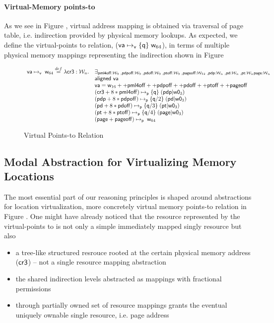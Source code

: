 \paragraph{Virtual-Memory points-to} As we see in Figure , virtual address mapping is obtained via traversal of page table, i.e. indirection provided by physical memory lookups. As expected, we define the virtual-points to relation, ($\mathsf{va}\mapsto_{\mathsf{v}}\{\mathsf{q}\}\;\mathsf{w}_{64}$), in terms of multiple physical memory mappings representing the indirection shown in Figure 
\begin{figure*}
\[
\begin{array}{cl}
  \mathsf{va}\mapsto_{\mathsf{v}}\;\mathsf{w}_{64} \stackrel{def}{=} \lambda \mathsf{cr3}:\mathcal{W}_n.
  & \exists_{\mathsf{pml4off}:\mathcal{W}_{9} \;, \mathsf{pdpoff}:\mathcal{W}_{9} \;, \mathsf{pdoff}:\mathcal{W}_{9} \;, \mathsf{ptoff}:\mathcal{W}_{9} \;, \mathsf{pageoff}:\mathcal{W}_{12} \;, \mathsf{pdp}:\mathcal{W}_n \;, \mathsf{pd}:\mathcal{W}_n \;, \mathsf{pt}:\mathcal{W}_n \mathsf{page}:\mathcal{W}_n}\\
  & \textsf{aligned } \mathsf{va} \\
  & \mathsf{va} = \mathsf{w}_{16} ++ \mathsf{pml4off} ++ \mathsf{pdpoff} ++ \mathsf{pdoff} ++ \mathsf{ptoff} ++ \mathsf{pageoff} \\
  &  (\mathsf{cr3}+8*\mathsf{pml4off})\mapsto_{\mathsf{p}}\{\mathsf{q}\}\;(\mathsf{pdp} | \mathsf{w0}_{3}) \\
  &  (\mathsf{pdp}+8*\mathsf{pdpoff})\mapsto_{\mathsf{p}}\{\mathsf{q}/2\}\;(\mathsf{pd} | \mathsf{w0}_{3}) \\
  & (\mathsf{pd}+8*\mathsf{pdoff})\mapsto_{\mathsf{p}}\{\mathsf{q}/3\}\;(\mathsf{pt} | \mathsf{w0}_{3}) \\
  & (\mathsf{pt}+8*\mathsf{ptoff})\mapsto_{\mathsf{p}}\{\mathsf{q}/4\}\;(\mathsf{page} | \mathsf{w0}_{3}) \\
  & (\mathsf{page}+\mathsf{pageoff})\mapsto_{\mathsf{p}}\;\mathsf{w}_{64} \\

\end{array}
\]
\caption{Virtual Points-to Relation}
  \label{fig:virtualpointsto}
\end{figure*}
\subsection{Modal Abstraction for Virtualizing Memory Locations}
\label{sec:modallocationvirtualization}

The most essential part of our reasoning principles is shaped around abstractions for location virtualization, more concretely virtual memory points-to relation in Figure . One might have already noticed that the resource represented by the virtual-points to is not only a simple immediately mapped singly resource but also
\begin{itemize}
\item a tree-like structured resrouce rooted at the certain physical memory address ($\mathsf{cr3}$) -- not a single resource mapping abstraction 
\item the shared indirection levels abstracted as mappings with fractional permissions
\item through partially owned set of resource mappings grants the eventual uniquely ownable single resource, i.e. page address 
\end{itemize}

